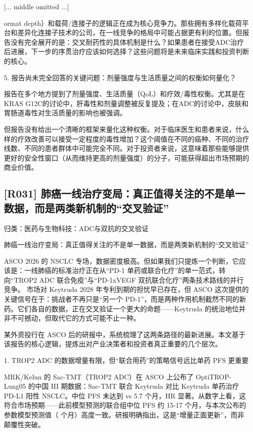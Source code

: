 \documentclass[11pt]{ctexart}
\begin{document}
[... middle omitted ...]

ormat depth）和载荷/连接子的逻辑正在成为核心竞争力。那些拥有多样化载荷平台和差异化连接子技术的公司，在一线竞争的格局中可能占据更有利的位置。但报告没有完全展开的是：交叉耐药性的具体机制是什么？如果患者在接受ADC治疗后进展，下一步的序贯治疗应该如何选择？这些问题将是未来临床实践和投资判断的核心。

5. 报告尚未完全回答的关键问题：剂量强度与生活质量之间的权衡如何量化？

报告在多个地方提到了剂量强度、生活质量（QoL）和疗效/毒性权衡。尤其是在KRAS G12C的讨论中，肝毒性和剂量调整被反复提及；在ADC的讨论中，皮肤和胃肠道毒性对生活质量的影响也被强调。

但报告没有给出一个清晰的框架来量化这种权衡。对于临床医生和患者来说，什么样的疗效改善可以接受一定程度的毒性增加？这个阈值在不同的癌种、不同的治疗线数、不同的患者群体中可能完全不同。对于投资者来说，这意味着那些能够提供更好的安全性窗口（从而维持更高的剂量强度）的分子，可能获得超出市场预期的商业价值。

\subsection{[R031] 肺癌一线治疗变局：真正值得关注的不是单一数据，而是两类新机制的“交叉验证”}
{\small\color{refgray}归类：医药与生物科技：ADC与双抗的交叉验证}

肺癌一线治疗变局：真正值得关注的不是单一数据，而是两类新机制的“交叉验证”

ASCO 2026 的 NSCLC 专场，数据密度极高。但如果我们只提炼一个判断，它应该是：一线肺癌的标准治疗正在从“PD-1 单药或联合化疗”的单一范式，转向“TROP2 ADC 联合免疫”与“PD-1xVEGF 双抗联合化疗”两条技术路线的并行竞争。 市场对 Keytruda 2028 年专利到期的担忧早已存在，但 ASCO 这次提供的关键信号在于：挑战者不再只是“另一个 PD-1”，而是两种作用机制截然不同的新药。它们各自的数据，正在交叉验证一个更大的命题——Keytruda 的统治地位并非不可撼动，但取代它的方式可能不止一种。

某外资投行在 ASCO 后的研报中，系统梳理了这两条路径的最新进展。本文基于该报告的核心逻辑，提炼出对产业决策者和投资者真正重要的几个层次。

1. TROP2 ADC 的数据增量有限，但“联合用药”的策略信号远比单药 PFS 更重要

MRK/Kelun 的 Sac-TMT（TROP2 ADC）在 ASCO 上公布了 OptiTROP-Lung05 的中国 III 期数据：Sac-TMT 联合 Keytruda 对比 Keytruda 单药治疗 PD-L1 阳性 NSCLC。中位 PFS 未达到 vs 5.7 个月，HR 显著。从数字上看，这符合市场预期——此前模型预测的联合组中位 PFS 约 15-17 个月，与本次公布的参数模型预测值（ 个月）高度一致。研报明确指出，这是“增量正面更新”，而非颠覆性突破。
\end{document}
